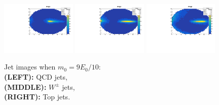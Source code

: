 \begin{figure}
    \begin{center}
        \includegraphics[width=0.32\textwidth]{./9/imageQCD.pdf}
        \includegraphics[width=0.32\textwidth]{./9/imageW.pdf}
        \includegraphics[width=0.32\textwidth]{./9/imageTOP.pdf}
        \caption{
            Jet images when $m_{0}=9E_{0}/10$:\\
            {\bf(LEFT):} QCD jets,\\
            {\bf(MIDDLE):} $W^{\pm}$ jets,\\
            {\bf(RIGHT):} Top jets.
        }
        \label{fig:case9}
    \end{center}
\end{figure}
